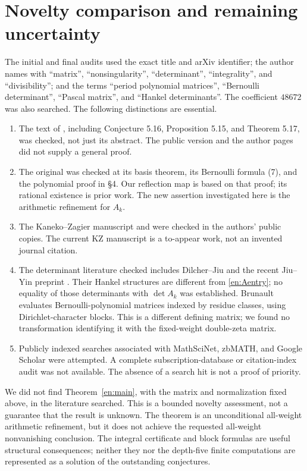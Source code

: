 \documentclass[12pt]{amsart}
\theoremstyle{definition}
\theoremstyle{remark}
\numberwithin{equation}{section}
\theoremstyle{definition}
\theoremstyle{remark}
\begin{document}
\section{Novelty comparison and remaining uncertainty}\label{en:audit}
The initial and final audits used the exact title and arXiv identifier;
the author names with ``matrix'', ``nonsingularity'', ``determinant'',
``integrality'', and ``divisibility''; and the terms ``period polynomial
matrices'', ``Bernoulli determinant'', ``Pascal matrix'', and ``Hankel
determinants''. The coefficient $48672$ was also searched. The following
distinctions are essential.
\begin{enumerate}
\item The text of \cite{BR}, including Conjecture 5.16, Proposition 5.15,
and Theorem 5.17, was checked, not just its abstract. The public version
and the author pages did not supply a general proof.
\item The original \cite{GKZ} was checked at its basis theorem, its
Bernoulli formula (7), and the polynomial proof in \S4. Our reflection
map is based on that proof; its rational existence is prior work. The
new assertion investigated here is the arithmetic refinement for $A_k$.
\item The Kaneko--Zagier manuscript \cite{KZ} and \cite{IKZ} were checked
in the authors' public copies. The current KZ manuscript is a
to-appear work, not an invented journal citation.
\item The determinant literature checked includes Dilcher--Jiu
\cite{DJ} and the recent Jiu--Yin preprint \cite{JY}. Their Hankel
structures are different from \eqref{en:Aentry}; no equality of those
determinants with $\det A_k$ was established.
Brunault \cite[definition of $D_{k,N}$ and Theorem 4.1]{Bru}
evaluates Bernoulli-polynomial matrices indexed by residue classes, using
Dirichlet-character blocks. This is a different defining matrix; we found
no transformation identifying it with the fixed-weight double-zeta matrix.
\item Publicly indexed searches associated with MathSciNet, zbMATH,
and Google Scholar were attempted. A complete subscription-database
or citation-index audit was not available. The absence of a search
hit is not a proof of priority.
\end{enumerate}
We did not find Theorem~\ref{en:main}, with the matrix and normalization
fixed above, in the literature searched. This is a bounded novelty
assessment, not a guarantee that the result is unknown. The theorem is
an unconditional all-weight arithmetic refinement, but it does not
achieve the requested all-weight nonvanishing conclusion. The integral
certificate and block formulas are useful structural consequences;
neither they nor the depth-five finite computations are represented
as a solution of the outstanding conjectures.
\end{document}
